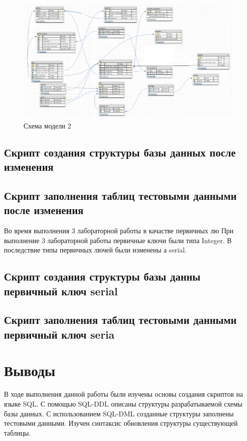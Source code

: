\begin{figure}[H]
	\begin{center}
		\includegraphics[scale=0.6]{../../diagram/diagram2.png}
		\caption{Схема модели 2} 
		\label{pic:pic_name2} %
	\end{center}
\end{figure}

\subsection{Скрипт создания структуры базы данных после изменения}



\subsection{Скрипт заполнения таблиц тестовыми данными после изменения}



Во время выполнения 3 лабораторной работы в качастве первичных лю
При выполнение 3 лабораторной работы первичные ключи были типа Integer. В последствие типы первичных лючей были изменены а serial.

\subsection{Скрипт создания структуры базы данны первичный ключ serial}



\subsection{Скрипт заполнения таблиц тестовыми данными первичный ключ seria}



\section{Выводы}

В ходе выполнения данной работы были изучены основы создания скриптов на языке SQL. С помощью SQL-DDL описаны структуры разрабатываемой схемы базы данных. С использованием SQL-DML созданные структуры заполнены тестовыми данными. Изучен синтаксис обновления структуры существующей таблицы.


